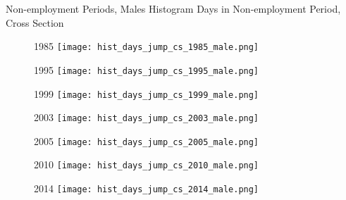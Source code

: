 \documentclass[hyperref={bookmarks=false}]{beamer}
\begin{document}
\begin{appendix}
\begin{frame}{Non-employment Periods, Males}
Histogram Days in Non-employment Period, Cross Section
\begin{figure}[!t]
\centering
\begin{minipage}[b]{0.3\textwidth}{1985}
\centering
\texttt{[image: hist\_days\_jump\_cs\_1985\_male.png]}
\end{minipage}
\begin{minipage}[b]{0.30\textwidth}{1995}
\centering
\texttt{[image: hist\_days\_jump\_cs\_1995\_male.png]}
\end{minipage}
\begin{minipage}[b]{0.30\textwidth}{1999}
\centering
\texttt{[image: hist\_days\_jump\_cs\_1999\_male.png]}
\end{minipage}
\begin{minipage}[b]{0.30\textwidth}{2003}
\centering
\texttt{[image: hist\_days\_jump\_cs\_2003\_male.png]}
\end{minipage}
\begin{minipage}[b]{0.30\textwidth}{2005}
\centering
\texttt{[image: hist\_days\_jump\_cs\_2005\_male.png]}
\end{minipage}
\begin{minipage}[b]{0.30\textwidth}{2010}
\centering
\texttt{[image: hist\_days\_jump\_cs\_2010\_male.png]}
\end{minipage}
\begin{minipage}[b]{0.30\textwidth}{2014}
\centering
\texttt{[image: hist\_days\_jump\_cs\_2014\_male.png]}
\end{minipage}
\end{figure}
\end{frame}


\end{appendix}
\end{document}
